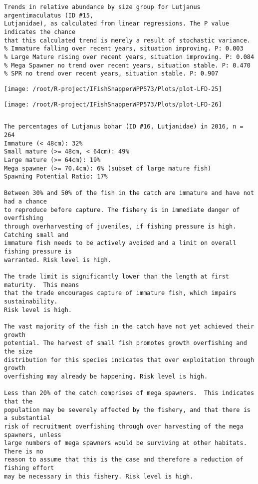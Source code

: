 \documentclass{report}\usepackage[]{graphicx}\usepackage[]{color}
\makeatletter
\def\maxwidth{ %
  \ifdim\Gin@nat@width>\linewidth
    \linewidth
  \else
    \Gin@nat@width
  \fi
}
\newenvironment{kframe}{%
 \def\at@end@of@kframe{}%
 \ifinner\ifhmode%
  \def\at@end@of@kframe{\end{minipage}}%
  \begin{minipage}{\columnwidth}%
 \fi\fi%
 \def\FrameCommand##1{\hskip\@totalleftmargin \hskip-\fboxsep
 \colorbox{shadecolor}{##1}\hskip-\fboxsep
     \hskip-\linewidth \hskip-\@totalleftmargin \hskip\columnwidth}%
 \MakeFramed {\advance\hsize-\width
   \@totalleftmargin\z@ \linewidth\hsize
   \@setminipage}}%
 {\par\unskip\endMakeFramed%
 \at@end@of@kframe}
\newenvironment{knitrout}{}{} %
\makeatother
\begin{document}
\begin{knitrout}
\begin{kframe}
\begin{verbatim}
Trends in relative abundance by size group for Lutjanus argentimaculatus (ID #15,
Lutjanidae), as calculated from linear regressions. The P value indicates the chance
that this calculated trend is merely a result of stochastic variance.
% Immature falling over recent years, situation improving. P: 0.003
% Large Mature rising over recent years, situation improving. P: 0.084
% Mega Spawner no trend over recent years, situation stable. P: 0.470
% SPR no trend over recent years, situation stable. P: 0.907
\end{verbatim}
\end{kframe}
\texttt{[image: /root/R-project/IFishSnapperWPP573/Plots/plot-LFD-25]} 

\texttt{[image: /root/R-project/IFishSnapperWPP573/Plots/plot-LFD-26]} 
\begin{kframe}\begin{verbatim}
\end{verbatim}
\end{kframe}
\clearpage
\newpage
\begin{kframe}\begin{verbatim}The percentages of Lutjanus bohar (ID #16, Lutjanidae) in 2016, n = 264
Immature (< 48cm): 32%
Small mature (>= 48cm, < 64cm): 49%
Large mature (>= 64cm): 19%
Mega spawner (>= 70.4cm): 6% (subset of large mature fish)
Spawning Potential Ratio: 17%
 
Between 30% and 50% of the fish in the catch are immature and have not had a chance
to reproduce before capture. The fishery is in immediate danger of overfishing
through overharvesting of juveniles, if fishing pressure is high.  Catching small and
immature fish needs to be actively avoided and a limit on overall fishing pressure is
warranted. Risk level is high.

The trade limit is significantly lower than the length at first maturity.  This means
that the trade encourages capture of immature fish, which impairs sustainability.
Risk level is high.

The vast majority of the fish in the catch have not yet achieved their growth
potential. The harvest of small fish promotes growth overfishing and the size
distribution for this species indicates that over exploitation through growth
overfishing may already be happening. Risk level is high.

Less than 20% of the catch comprises of mega spawners.  This indicates that the
population may be severely affected by the fishery, and that there is a substantial
risk of recruitment overfishing through over harvesting of the mega spawners, unless
large numbers of mega spawners would be surviving at other habitats. There is no
reason to assume that this is the case and therefore a reduction of fishing effort
may be necessary in this fishery. Risk level is high.
 

\end{verbatim}
\end{kframe}
\end{knitrout}
\end{document}
